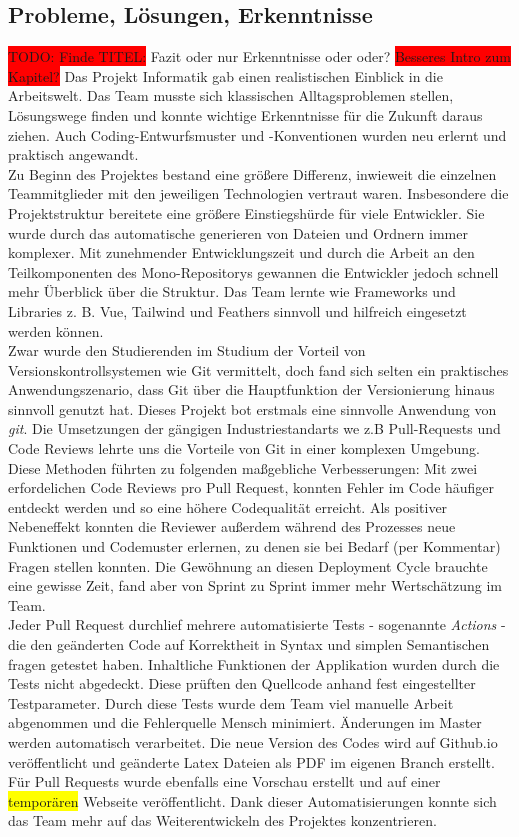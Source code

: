 \documentclass[10pt, a4paper]{article}
\begin{document}
\subsection{Probleme, Lösungen, Erkenntnisse}
\colorbox{red}{TODO: Finde TITEL:} Fazit oder nur Erkenntnisse oder oder?
\colorbox{red}{Besseres Intro zum Kapitel?}
Das Projekt Informatik gab einen realistischen Einblick in die Arbeitswelt.
Das Team musste sich klassischen Alltagsproblemen stellen, Lösungswege finden und konnte wichtige Erkenntnisse für die Zukunft daraus ziehen.
Auch Coding-Entwurfsmuster und -Konventionen wurden neu erlernt und praktisch angewandt.
$~$ \\
Zu Beginn des Projektes bestand eine größere Differenz, inwieweit die einzelnen Teammitglieder mit den jeweiligen Technologien vertraut waren.
Insbesondere die Projektstruktur bereitete eine größere Einstiegshürde für viele Entwickler.
Sie wurde durch das automatische generieren von Dateien und Ordnern immer komplexer.
Mit zunehmender Entwicklungszeit und durch die Arbeit an den Teilkomponenten des Mono-Repositorys gewannen die Entwickler jedoch schnell mehr Überblick über die Struktur.
Das Team lernte wie Frameworks und Libraries  z. B. Vue, Tailwind und Feathers sinnvoll und hilfreich eingesetzt werden können.
$~$ \\
Zwar wurde den Studierenden im Studium der Vorteil von Versionskontrollsystemen wie Git vermittelt, doch fand sich selten ein praktisches Anwendungszenario, dass Git über die Hauptfunktion der Versionierung hinaus sinnvoll genutzt hat.
Dieses Projekt bot erstmals eine sinnvolle Anwendung von \textit{git}.
Die Umsetzungen der gängigen Industriestandarts we z.B Pull-Requests und Code Reviews lehrte uns die Vorteile von Git in einer komplexen Umgebung.
Diese Methoden führten zu folgenden maßgebliche Verbesserungen:
Mit zwei erfordelichen Code Reviews pro Pull Request, konnten Fehler im Code häufiger entdeckt werden und so eine höhere Codequalität erreicht.
Als positiver Nebeneffekt konnten die Reviewer außerdem während des Prozesses neue Funktionen und Codemuster erlernen, zu denen sie bei Bedarf (per Kommentar) Fragen stellen konnten.
Die Gewöhnung an diesen Deployment Cycle brauchte eine gewisse Zeit, fand aber von Sprint zu Sprint immer mehr Wertschätzung im Team.
$~$ \\
Jeder Pull Request durchlief mehrere automatisierte Tests - sogenannte \textit{Actions} - die den geänderten Code auf Korrektheit in Syntax und simplen Semantischen fragen getestet haben.
Inhaltliche Funktionen der Applikation wurden durch die Tests nicht abgedeckt.
Diese prüften den Quellcode anhand fest eingestellter Testparameter.
Durch diese Tests wurde dem Team viel manuelle Arbeit abgenommen und die Fehlerquelle Mensch minimiert.
Änderungen im Master werden automatisch verarbeitet. Die neue Version des Codes wird auf Github.io veröffentlicht und geänderte Latex Dateien als PDF im eigenen Branch erstellt.
Für Pull Requests wurde ebenfalls eine Vorschau erstellt und auf einer \colorbox{yellow}{temporären} Webseite veröffentlicht.
Dank dieser Automatisierungen konnte sich das Team mehr auf das Weiterentwickeln des Projektes konzentrieren.
\end{document}

